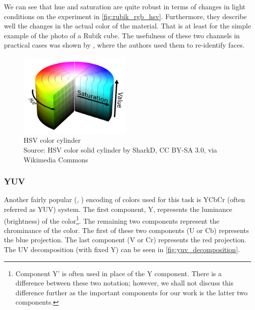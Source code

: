 

We can see that hue and saturation are quite robust in terms of changes in light conditions on the experiment in \autoref{fig:rubik_rgb_hsv}. Furthermore, they describe well the changes in the actual color of the material. That is at least for the simple example of the photo of a Rubik cube. The usefulness of these two channels in practical cases was shown by \cite{mckenna1997tracking}, where the authors used them to re-identify faces.

\begin{figure}
    \centering
    \includegraphics[width=5.5cm]{img/HSV_color_solid_cylinder.png}
    \caption[HSV color cylinder]{HSV color cylinder\\Source: HSV color solid cylinder\protect\footnotemark{} by SharkD, CC BY-SA 3.0\protect\footnotemark{}, via Wikimedia Commons}
    \label{fig:hsv_cylinder}
\end{figure}
\addtocounter{footnote}{-2}

\subsubsection{YUV}

Another fairly popular (\cite{orwell1999multi}, \cite{wren1997pfinder}) encoding of colors used for this task is YCbCr (often referred as YUV) system. The first component, Y, represents the luminance (brightness) of the color\footnote{Component Y' is often used in place of the Y component. There is a difference between these two notation; however, we shall not discuss this difference further as the important components for our work is the latter two components.}. The remaining two components represent the chrominance of the color. The first of these two components (U or Cb) represents the blue projection. The last component (V or Cr) represents the red projection. The UV decomposition (with fixed Y) can be seen in \autoref{fig:yuv_decomposition}.

